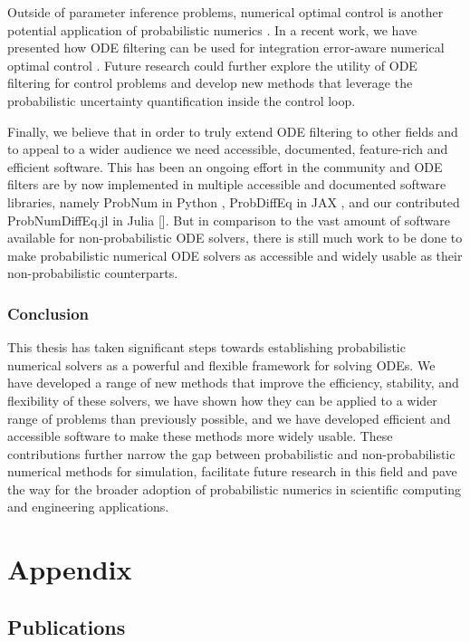 \documentclass{mimosis}
\begin{document}
Outside of parameter inference problems, numerical optimal control is another potential application of probabilistic numerics
\parencite{cao2024computationawarelearningstablecontrol,cao2024impact}.
In a recent work, we have presented how ODE filtering can be used for integration error-aware numerical optimal control \parencite{lahr2024probabilistic}.
Future research could further explore the utility of ODE filtering for control problems and develop new methods that leverage the probabilistic uncertainty quantification inside the control loop.

Finally, we believe that in order to truly extend ODE filtering to other fields and to appeal to a wider audience we need accessible, documented, feature-rich and efficient software.
This has been an ongoing effort in the community and ODE filters are by now implemented in multiple accessible and documented software libraries, namely
ProbNum in Python \parencite{wenger2021probnum},
ProbDiffEq in JAX \parencite{kramer2024implementing},
and our contributed ProbNumDiffEq.jl in Julia
{[}\sjoss{}].
But in comparison to the vast amount of software available for non-probabilistic ODE solvers, there is still much work to be done to make probabilistic numerical ODE solvers as accessible and widely usable as their non-probabilistic counterparts.
\section{Conclusion}
\label{sec:org9e9d18c}

This thesis has taken significant steps towards establishing probabilistic numerical solvers as a powerful and flexible framework for solving ODEs.
We have developed a range of new methods that improve the efficiency, stability, and flexibility of these solvers, we have shown how they can be applied to a wider range of problems than previously possible, and we have developed efficient and accessible software to make these methods more widely usable.
These contributions further narrow the gap between probabilistic and non-probabilistic numerical methods for simulation, facilitate future research in this field and pave the way for the broader adoption of probabilistic numerics in scientific computing and engineering applications.
\backmatter
\printbibliography
\part{Appendix}
\label{part:appendix}
\chapter{Publications}
\label{sec:org4ecc82b}
\label{appendix:publications}
\etocarticlestyle
{}
\localtableofcontents*
\end{document}
